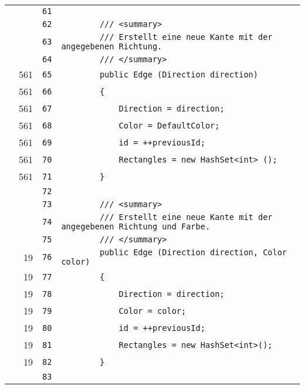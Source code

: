 \documentclass[a4paper,10pt]{article}
\begin{document}
\begin{longtable}[l]{lrrl}
\cellcolor{gray} &  & \verb~61~ & \verb~~\\
\cellcolor{gray} &  & \verb~62~ & \verb~        /// <summary>~\\
\cellcolor{gray} &  & \verb~63~ & \verb~        /// Erstellt eine neue Kante mit der angegebenen Richtung.~\\
\cellcolor{gray} &  & \verb~64~ & \verb~        /// </summary>~\\
\cellcolor{green} & 561 & \verb~65~ & \verb~        public Edge (Direction direction)~\\
\cellcolor{green} & 561 & \verb~66~ & \verb~        {~\\
\cellcolor{green} & 561 & \verb~67~ & \verb~            Direction = direction;~\\
\cellcolor{green} & 561 & \verb~68~ & \verb~            Color = DefaultColor;~\\
\cellcolor{green} & 561 & \verb~69~ & \verb~            id = ++previousId;~\\
\cellcolor{green} & 561 & \verb~70~ & \verb~            Rectangles = new HashSet<int> ();~\\
\cellcolor{green} & 561 & \verb~71~ & \verb~        }~\\
\cellcolor{gray} &  & \verb~72~ & \verb~~\\
\cellcolor{gray} &  & \verb~73~ & \verb~        /// <summary>~\\
\cellcolor{gray} &  & \verb~74~ & \verb~        /// Erstellt eine neue Kante mit der angegebenen Richtung und Farbe.~\\
\cellcolor{gray} &  & \verb~75~ & \verb~        /// </summary>~\\
\cellcolor{green} & 19 & \verb~76~ & \verb~        public Edge (Direction direction, Color color)~\\
\cellcolor{green} & 19 & \verb~77~ & \verb~        {~\\
\cellcolor{green} & 19 & \verb~78~ & \verb~            Direction = direction;~\\
\cellcolor{green} & 19 & \verb~79~ & \verb~            Color = color;~\\
\cellcolor{green} & 19 & \verb~80~ & \verb~            id = ++previousId;~\\
\cellcolor{green} & 19 & \verb~81~ & \verb~            Rectangles = new HashSet<int>();~\\
\cellcolor{green} & 19 & \verb~82~ & \verb~        }~\\
\cellcolor{gray} &  & \verb~83~ & \verb~~\\

\end{longtable}
\end{document}
